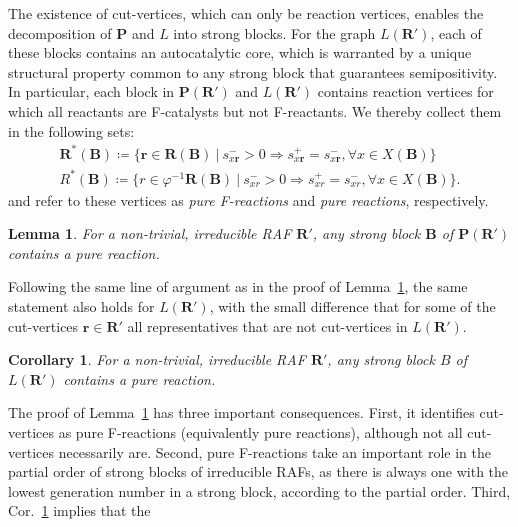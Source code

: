 \documentclass[pdflatex]{sn-jnl}
\theoremstyle{thmstyleone}%
\newtheorem{corollary}[theorem]{Corollary}%
\newtheorem{lemma}[theorem]{Lemma}%
\theoremstyle{examplesty}%
\theoremstyle{thmstylethree}%
\newcommand{\princess}{\mathbf{P}}
\newcommand{\lord}{L}
\newcommand{\FR}[0]{\mathbf{R}}
\newcommand{\fr}[0]{\mathbf{r}}
\newcommand{\RAF}[0]{\mathbf{R}'}
\newcommand{\block}[0]{\mathbf{B}}
\begin{document}
The existence of cut-vertices, which can only be reaction vertices, enables
the decomposition of $\princess$ and $\lord$ into strong blocks. For the
graph $\lord(\RAF)$, each of these blocks contains an autocatalytic core,
which is warranted by a unique structural property common to any strong
block that guarantees semipositivity. In particular, each block in
$\princess(\RAF)$ and $\lord(\RAF)$ contains reaction vertices for which
all reactants are F-catalysts but not F-reactants.  We thereby collect them
in the following sets:
\begin{equation}
  \begin{split}
    \FR^*(\block)\coloneqq \{\fr\in \FR(\block) \ | \ s^-_{x\fr}>0
    \Rightarrow s^+_{x\fr}=s^-_{x\fr}, \forall x\in X(\block)\}
    \\ R^*(\block)\coloneqq \{r\in \varphi^{-1}{\FR}(\block) \ |
    \ s^-_{xr}>0 \Rightarrow s^+_{xr}=s^-_{xr}, \forall x\in X(\block)\}.
  \end{split}
\end{equation}
and refer to these vertices as \emph{pure F-reactions} and \emph{pure
reactions}, respectively.
\vspace{6pt}
\begin{lemma}\label{lem:cutVertexPureCat}
  For a non-trivial, irreducible RAF $\RAF$, any strong block $\block$ of
  $\princess(\RAF)$ contains a pure reaction.
\end{lemma}
\vspace{6pt}
%
Following the same line of argument as in the proof of
Lemma~\ref{lem:cutVertexPureCat}, the same statement also holds for
$\lord(\RAF)$, with the small difference that for some of the cut-vertices
$\fr\in \RAF$ all representatives that are not cut-vertices in
$\lord(\RAF)$.
\vspace{6pt}
\begin{corollary}\label{cor:cutVertexPureCat}
  For a non-trivial, irreducible RAF $\RAF$, any strong block $B$ of
  $\lord(\RAF)$ contains a pure reaction.
\end{corollary}
\vspace{6pt}
%
The proof of Lemma~\ref{lem:cutVertexPureCat} has three important
consequences. First, it identifies cut-vertices as pure F-reactions
(equivalently pure reactions), although not all cut-vertices necessarily
are. Second, pure F-reactions take an important role in the partial order
of strong blocks of irreducible RAFs, as there is always one with the
lowest generation number in a strong block, according to the partial
order. Third, Cor.~\ref{cor:cutVertexPureCat} implies that the
\end{document}
